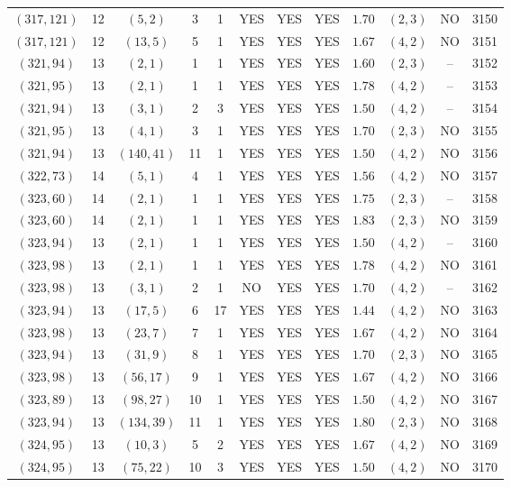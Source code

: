 \begin{longtable}{|c|c|c|c|c|c|c|c|c|c|c|c|}
$(317,121)$ & 12 & $(5,2)$ & 3 & 1 & YES & YES & YES & $1.70$ & $(2,3)$ & NO & 3150\\
$(317,121)$ & 12 & $(13,5)$ & 5 & 1 & YES & YES & YES & $1.67$ & $(4,2)$ & NO & 3151\\
$(321,94)$ & 13 & $(2,1)$ & 1 & 1 & YES & YES & YES & $1.60$ & $(2,3)$ & -- & 3152\\
$(321,95)$ & 13 & $(2,1)$ & 1 & 1 & YES & YES & YES & $1.78$ & $(4,2)$ & -- & 3153\\
$(321,94)$ & 13 & $(3,1)$ & 2 & 3 & YES & YES & YES & $1.50$ & $(4,2)$ & -- & 3154\\
$(321,95)$ & 13 & $(4,1)$ & 3 & 1 & YES & YES & YES & $1.70$ & $(2,3)$ & NO & 3155\\
$(321,94)$ & 13 & $(140,41)$ & 11 & 1 & YES & YES & YES & $1.50$ & $(4,2)$ & NO & 3156\\
$(322,73)$ & 14 & $(5,1)$ & 4 & 1 & YES & YES & YES & $1.56$ & $(4,2)$ & NO & 3157\\
$(323,60)$ & 14 & $(2,1)$ & 1 & 1 & YES & YES & YES & $1.75$ & $(2,3)$ & -- & 3158\\
$(323,60)$ & 14 & $(2,1)$ & 1 & 1 & YES & YES & YES & $1.83$ & $(2,3)$ & NO & 3159\\
$(323,94)$ & 13 & $(2,1)$ & 1 & 1 & YES & YES & YES & $1.50$ & $(4,2)$ & -- & 3160\\
$(323,98)$ & 13 & $(2,1)$ & 1 & 1 & YES & YES & YES & $1.78$ & $(4,2)$ & NO & 3161\\
$(323,98)$ & 13 & $(3,1)$ & 2 & 1 & NO & YES & YES & $1.70$ & $(4,2)$ & -- & 3162\\
$(323,94)$ & 13 & $(17,5)$ & 6 & 17 & YES & YES & YES & $1.44$ & $(4,2)$ & NO & 3163\\
$(323,98)$ & 13 & $(23,7)$ & 7 & 1 & YES & YES & YES & $1.67$ & $(4,2)$ & NO & 3164\\
$(323,94)$ & 13 & $(31,9)$ & 8 & 1 & YES & YES & YES & $1.70$ & $(2,3)$ & NO & 3165\\
$(323,98)$ & 13 & $(56,17)$ & 9 & 1 & YES & YES & YES & $1.67$ & $(4,2)$ & NO & 3166\\
$(323,89)$ & 13 & $(98,27)$ & 10 & 1 & YES & YES & YES & $1.50$ & $(4,2)$ & NO & 3167\\
$(323,94)$ & 13 & $(134,39)$ & 11 & 1 & YES & YES & YES & $1.80$ & $(2,3)$ & NO & 3168\\
$(324,95)$ & 13 & $(10,3)$ & 5 & 2 & YES & YES & YES & $1.67$ & $(4,2)$ & NO & 3169\\
$(324,95)$ & 13 & $(75,22)$ & 10 & 3 & YES & YES & YES & $1.50$ & $(4,2)$ & NO & 3170\\

\end{longtable}
